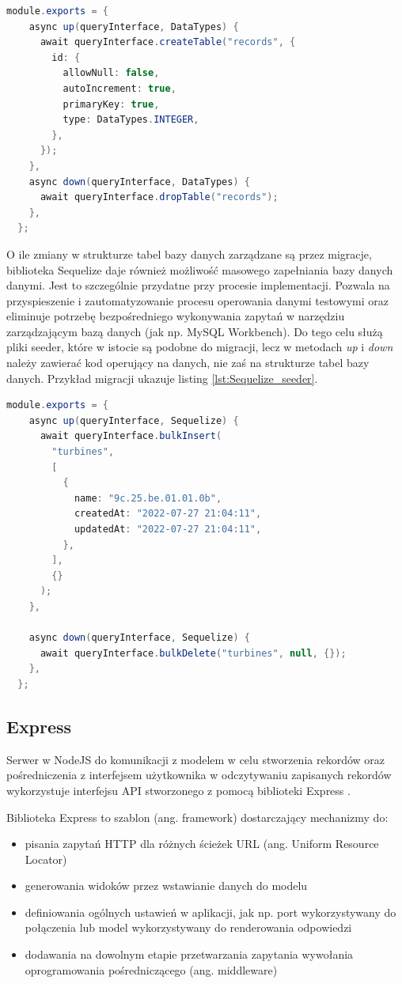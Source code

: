 \documentclass{sprz}
\begin{document}
\begin{lstlisting}[language=Java,caption={Przykład pliku migracji}, label={lst:Sequelize_migration}]
  module.exports = {
    async up(queryInterface, DataTypes) {
      await queryInterface.createTable("records", {
        id: {
          allowNull: false,
          autoIncrement: true,
          primaryKey: true,
          type: DataTypes.INTEGER,
        },
      });
    },
    async down(queryInterface, DataTypes) {
      await queryInterface.dropTable("records");
    },
  };
\end{lstlisting}

O ile zmiany w strukturze tabel bazy danych zarządzane są przez migracje, biblioteka Sequelize daje również możliwość masowego zapełniania bazy danych danymi. Jest to szczególnie przydatne przy procesie implementacji. Pozwala na przyspieszenie i zautomatyzowanie procesu operowania danymi testowymi oraz eliminuje potrzebę bezpośredniego wykonywania zapytań w narzędziu zarządzającym bazą danych (jak np. MySQL Workbench). Do tego celu służą pliki seeder, które w istocie są podobne do migracji, lecz w metodach \textit{up} i \textit{down} należy zawierać kod operujący na danych, nie zaś na strukturze tabel bazy danych. Przykład migracji ukazuje listing \ref{lst:Sequelize_seeder}.

\begin{lstlisting}[language=Java,caption={Przykład pliku seeder}, label={lst:Sequelize_seeder}]
  module.exports = {
    async up(queryInterface, Sequelize) {
      await queryInterface.bulkInsert(
        "turbines",
        [
          {
            name: "9c.25.be.01.01.0b",
            createdAt: "2022-07-27 21:04:11",
            updatedAt: "2022-07-27 21:04:11",
          },
        ],
        {}
      );
    },
  
    async down(queryInterface, Sequelize) {
      await queryInterface.bulkDelete("turbines", null, {});
    },
  };
\end{lstlisting}

\subsection*{Express}

Serwer w NodeJS do komunikacji z modelem w celu stworzenia rekordów oraz pośredniczenia z interfejsem użytkownika w odczytywaniu zapisanych rekordów wykorzystuje interfejsu API stworzonego z pomocą biblioteki Express \cite{express}.

Biblioteka Express to szablon (ang. framework) dostarczający mechanizmy do:
\begin{itemize}
  \item pisania zapytań HTTP dla różnych ścieżek URL (ang. Uniform Resource Locator)
  \item generowania widoków przez wstawianie danych do modelu
  \item definiowania ogólnych ustawień w aplikacji, jak np. port wykorzystywany do połączenia lub model wykorzystywany do renderowania odpowiedzi
  \item dodawania na dowolnym etapie przetwarzania zapytania wywołania oprogramowania pośredniczącego (ang. middleware)
\end{itemize}
\end{document}
